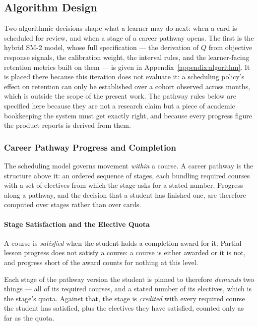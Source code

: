 \subsection{Algorithm Design}
\label{sec:algorithm_design}

Two algorithmic decisions shape what a learner may do next: when a card is
scheduled for review, and when a stage of a career pathway opens. The first is
the hybrid SM-2 model, whose full specification --- the derivation of $Q$ from
objective response signals, the calibration weight, the interval rules, and the
learner-facing retention metrics built on them --- is given in
Appendix~\ref{appendix:algorithm}. It is placed there because this iteration
does not evaluate it: a scheduling policy's effect on retention can only be
established over a cohort observed across months, which is outside the scope of
the present work. The pathway rules below are specified here because they are
not a research claim but a piece of academic bookkeeping the system must get
exactly right, and because every progress figure the product reports is derived
from them.

\subsubsection{Career Pathway Progress and Completion}
\label{sec:pathway_completion}
The scheduling model governs movement \textit{within} a course. A career pathway is the structure above it: an ordered sequence of stages, each bundling required courses with a set of electives from which the stage asks for a stated number. Progress along a pathway, and the decision that a student has finished one, are therefore computed over stages rather than over cards.

\paragraph{Stage Satisfaction and the Elective Quota}
A course is \textit{satisfied} when the student holds a completion award for
it. Partial lesson progress does not satisfy a course: a course is either
awarded or it is not, and progress short of the award counts for nothing at
this level.

Each stage of the pathway version the student is pinned to therefore
\textit{demands} two things --- all of its required courses, and a stated
number of its electives, which is the stage's quota. Against that, the stage is
\textit{credited} with every required course the student has satisfied, plus
the electives they have satisfied, counted only as far as the quota.


